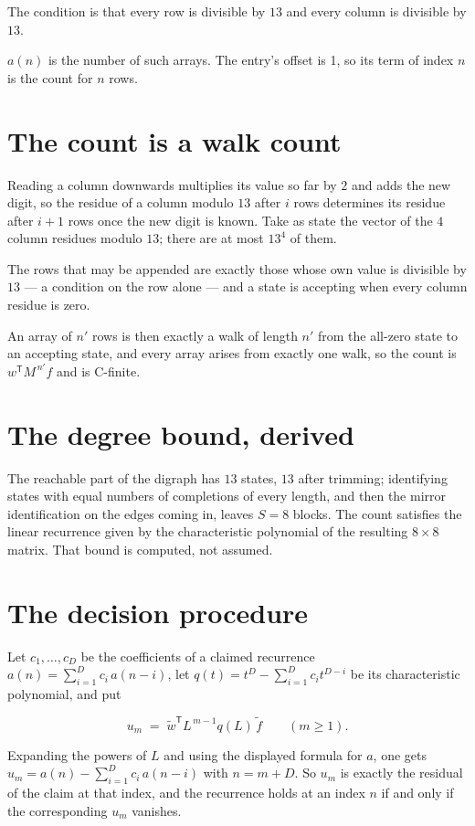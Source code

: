 \documentclass[11pt]{article}
\theoremstyle{definition}
\begin{document}
The condition is that every row is divisible by $13$ and every column is divisible by $13$.

$a(n)$ is the number of such arrays. The entry's offset is 1, so its term of index $n$ is the count for $n$ rows.

\section{The count is a walk count}

Reading a column downwards multiplies its value so far by $2$ and adds the new digit, so the residue of a column modulo $13$ after $i$ rows determines its residue after $i+1$ rows once the new digit is known. Take as state the vector of the $4$ column residues modulo $13$; there are at most $13^{4}$ of them.

The rows that may be appended are exactly those whose own value is divisible by $13$ --- a condition on the row alone --- and a state is accepting when every column residue is zero.

An array of $n'$ rows is then exactly a walk of length $n'$ from the all-zero state to an accepting state, and every array arises from exactly one walk, so the count is $w^{\mathsf T}M^{\,n'}f$ and is C-finite.

\section{The degree bound, derived}

The reachable part of the digraph has $13$ states, $13$ after trimming; identifying states with equal numbers of completions of every length, and then the mirror identification on the edges coming in, leaves $S = 8$ blocks. The count satisfies the linear recurrence given by the characteristic polynomial of the resulting $8\times8$ matrix. That bound is computed, not assumed.

\section{The decision procedure}

Let $c_1,\dots,c_D$ be the coefficients of a claimed recurrence $a(n) = \sum_{i=1}^{D} c_i\,a(n-i)$, let $q(t) = t^{D} - \sum_{i=1}^{D} c_i t^{D-i}$ be its characteristic polynomial, and put

\[u_m \;=\; \tilde w^{\mathsf T} L^{\,m-1} q(L)\,\tilde f \qquad (m \ge 1).\]

Expanding the powers of $L$ and using the displayed formula for $a$, one gets $u_m = a(n) - \sum_{i=1}^{D} c_i\,a(n-i)$ with $n = m + D$. So $u_m$ is exactly the residual of the claim at that index, and the recurrence holds at an index $n$ if and only if the corresponding $u_m$ vanishes.
\end{document}
